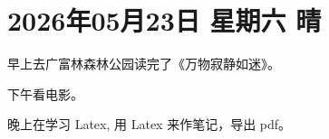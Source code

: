 \section{2026年05月23日 \quad 星期六 \quad 晴}

早上去广富林森林公园读完了《万物寂静如迷》。

下午看电影。

晚上在学习 Latex, 用 Latex 来作笔记，导出 pdf。

